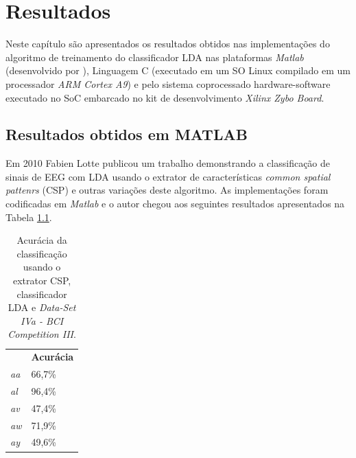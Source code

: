 \chapter[Resultados e Dicussão ]{Resultados}

Neste capítulo são apresentados os resultados obtidos nas implementações do algoritmo de treinamento do classificador LDA nas plataformas \textit{Matlab} (desenvolvido por \cite{F.Lotte}), Linguagem C (executado em um SO Linux compilado em um processador \textit{ARM Cortex A9}) e pelo sistema coprocessado hardware-software executado no SoC embarcado no kit de desenvolvimento \textit{Xilinx Zybo Board}.

\section{Resultados obtidos em MATLAB}
Em 2010 Fabien Lotte publicou um trabalho demonstrando a classificação de sinais de EEG com LDA \cite{F.Lotte} usando o extrator de características \textit{common spatial pattenrs} (CSP) e outras
variações deste algoritmo. 
As implementações foram codificadas em \textit{Matlab} e o autor chegou aos seguintes resultados apresentados na Tabela \ref{resultlotte}.



\begin{table}[h]
\centering
\caption{Acurácia da classificação usando o extrator CSP, classificador LDA e  \textit{Data-Set IVa - BCI Competition III}.}
\label{resultlotte}
	\begin{tabular}{ll}
	\rowcolor[HTML]{ECF4FF} 
	\multicolumn{1}{c}{\cellcolor[HTML]{ECF4FF}\textbf{Sujeito}} & \multicolumn{1}{c}{\cellcolor[HTML]{ECF4FF}\textbf{Acurácia}} \\
	\textit{aa}                                                  & 66,7\%                                                        \\
	\rowcolor[HTML]{ECF4FF} 
	\textit{al}                                                  & 96,4\%                                                        \\
	\textit{av}                                                  & 47,4\%                                                        \\
	\rowcolor[HTML]{ECF4FF} 
	\textit{aw}                                                  & 71,9\%                                                        \\
	\textit{ay}                                                  & 49,6\%                                                       
\end{tabular}
\end{table}
 
